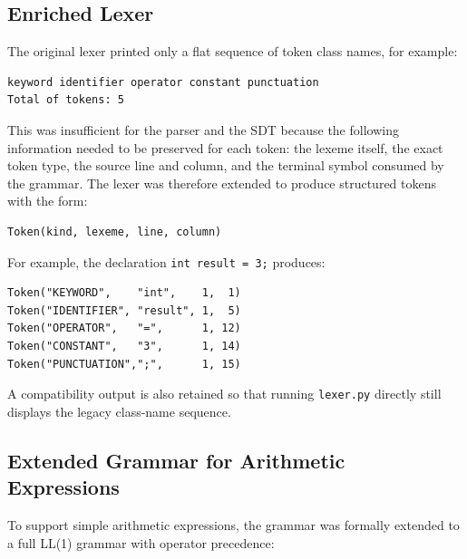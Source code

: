 \documentclass[letterpaper,12pt,oneside]{article}
\begin{document}
\subsection{Enriched Lexer}

The original lexer printed only a flat sequence of token class names, for example:

\begin{verbatim}
keyword identifier operator constant punctuation
Total of tokens: 5
\end{verbatim}

This was insufficient for the parser and the SDT because the following information
needed to be preserved for each token: the lexeme itself, the exact token type,
the source line and column, and the terminal symbol consumed by the grammar.
The lexer was therefore extended to produce structured tokens with the form:

\begin{verbatim}
Token(kind, lexeme, line, column)
\end{verbatim}

For example, the declaration \texttt{int result = 3;} produces:

\begin{verbatim}
Token("KEYWORD",    "int",    1,  1)
Token("IDENTIFIER", "result", 1,  5)
Token("OPERATOR",   "=",      1, 12)
Token("CONSTANT",   "3",      1, 14)
Token("PUNCTUATION",";",      1, 15)
\end{verbatim}

A compatibility output is also retained so that running \texttt{lexer.py} directly
still displays the legacy class-name sequence.


\subsection{Extended Grammar for Arithmetic Expressions}

To support simple arithmetic expressions, the grammar was formally extended to a
full LL(1) grammar with operator precedence:
\end{document}
